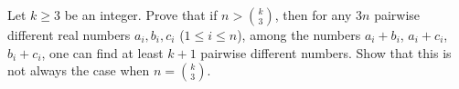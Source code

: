 Let $k\ge 3$ be an integer. Prove that if $n>\binom k3$, then for any $3n$ pairwise different real numbers $a_i,b_i,c_i$ ($1\le i\le n$), among the numbers $a_i+b_i$, $a_i+c_i$, $b_i+c_i$, one can find at least $k+1$ pairwise different numbers. Show that this is not always the case when $n=\binom k3$.